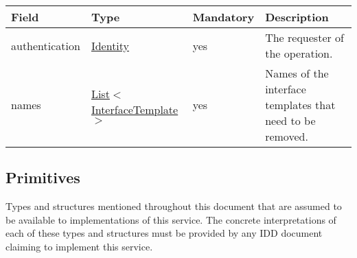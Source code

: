 \documentclass[a4paper]{arrowhead}
\newcommand{\pref}[1]{{\textcolor{ArrowheadGrey}{\hyperref[sec:model:primitives:#1]{#1}}}}
\begin{document}

\begin{table}[ht!]
\begin{tabularx}{\textwidth}{| p{2.5cm} | p{3.8cm} | p{2cm} | X |} \hline
\rowcolor{gray!33} Field & Type & Mandatory & Description \\ \hline
authentication & \hyperref[sec:model:Identity]{Identity} & yes & The requester of the operation. \\ \hline
names &  \pref{List}$<$\pref{InterfaceTemplate}$>$ & yes & Names of the interface templates that need to be removed. \\ \hline
\end{tabularx}
\end{table}

\subsection{Primitives}
\label{sec:model:primitives}

Types and structures mentioned throughout this document that are assumed to be available to implementations of this service.
The concrete interpretations of each of these types and structures must be provided by any IDD document claiming to implement this service.
\end{document}
